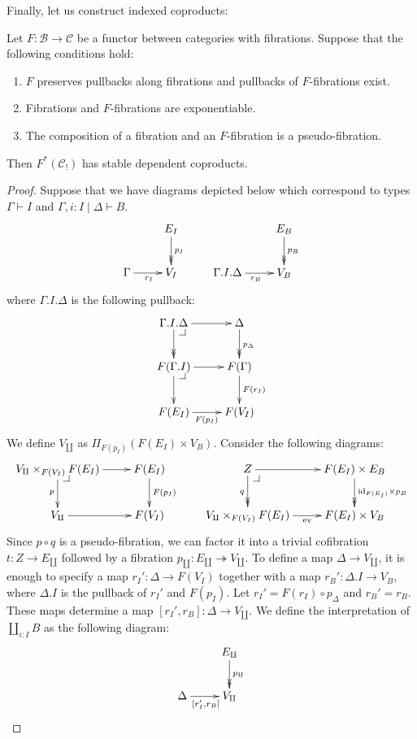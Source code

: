 \documentclass[reqno]{amsart}
\makeatletter
\theoremstyle{definition}
\theoremstyle{remark}
\newcommand{\fs}[1]{\mathrm{#1}}
\newcommand{\scat}[1]{\mathcal{#1}}
\newcommand{\id}{\fs{id}}
\numberwithin{figure}{section}
\newcommand{\pb}[1][dr]{\save*!/#1-1.2pc/#1:(-1,1)@^{|-}\restore}
\makeatother
\begin{document}
Finally, let us construct indexed coproducts:

\begin{prop}[coproducts]
Let $F : \scat{B} \to \scat{C}$ be a functor between categories with fibrations.
Suppose that the following conditions hold:
\begin{enumerate}
\item $F$ preserves pullbacks along fibrations and pullbacks of $F$-fibrations exist.
\item Fibrations and $F$-fibrations are exponentiable.
\item The composition of a fibration and an $F$-fibration is a pseudo-fibration.
\end{enumerate}
Then $F^*(\scat{C}_!)$ has stable dependent coproducts.
\end{prop}
\begin{proof}
Suppose that we have diagrams depicted below which correspond to types $\Gamma \vdash I$ and $\Gamma, i : I \mid \Delta \vdash B$.
\[ \xymatrix{                       & E_I \ar@{->>}[d]^{p_I} \\
              \Gamma \ar[r]_{r_I}   & V_I
            } \qquad
   \xymatrix{                               & E_B \ar@{->>}[d]^{p_B} \\
              \Gamma.I.\Delta \ar[r]_{r_B}  & V_B
            } \]
where $\Gamma.I.\Delta$ is the following pullback:
\[ \xymatrix{ \Gamma.I.\Delta \ar[r] \ar@{->>}[d] \pb   & \Delta \ar@{->>}[d]^{p_\Delta} \\
              F(\Gamma.I) \ar[r] \ar[d] \pb             & F(\Gamma) \ar[d]^{F(r_I)} \\
              F(E_I) \ar[r]_{F(p_I)}                    & F(V_I)
            } \]
We define $V_\amalg$ as $\Pi_{F(p_I)}(F(E_I) \times V_B)$.
Consider the following diagrams:
\[ \xymatrix{ V_\amalg \times_{F(V_I)} F(E_I) \ar[r] \ar[d]_p \pb   & F(E_I) \ar[d]^{F(p_I)} \\
              V_\amalg \ar[r]                                       & F(V_I)
            } \qquad
   \xymatrix{ Z \ar[r] \ar@{->>}[d]_q \pb                       & F(E_I) \times E_B \ar@{->>}[d]^{\id_{F(E_I)} \times p_B} \\
              V_\amalg \times_{F(V_I)} F(E_I) \ar[r]_-{\fs{ev}} & F(E_I) \times V_B
            } \]
Since $p \circ q$ is a pseudo-fibration, we can factor it into a trivial cofibration $t : Z \to E_\amalg$ followed by a fibration $p_\amalg : E_\amalg \twoheadrightarrow V_\amalg$.
To define a map $\Delta \to V_\amalg$, it is enough to specify a map $r_I' : \Delta \to F(V_I)$ together with a map $r_B' : \Delta.I \to V_B$, where $\Delta.I$ is the pullback of $r_I'$ and $F(p_I)$.
Let $r_I' = F(r_I) \circ p_\Delta$ and $r_B' = r_B$.
These maps determine a map $[r_I',r_B] : \Delta \to V_\amalg$.
We define the interpretation of $\coprod_{i : I} B$ as the following diagram:
\[ \xymatrix{                               & E_\amalg \ar@{->>}[d]^{p_\amalg} \\
              \Delta \ar[r]_{[r_I',r_B]}    & V_\amalg
            } \]


\end{proof}
\end{document}
